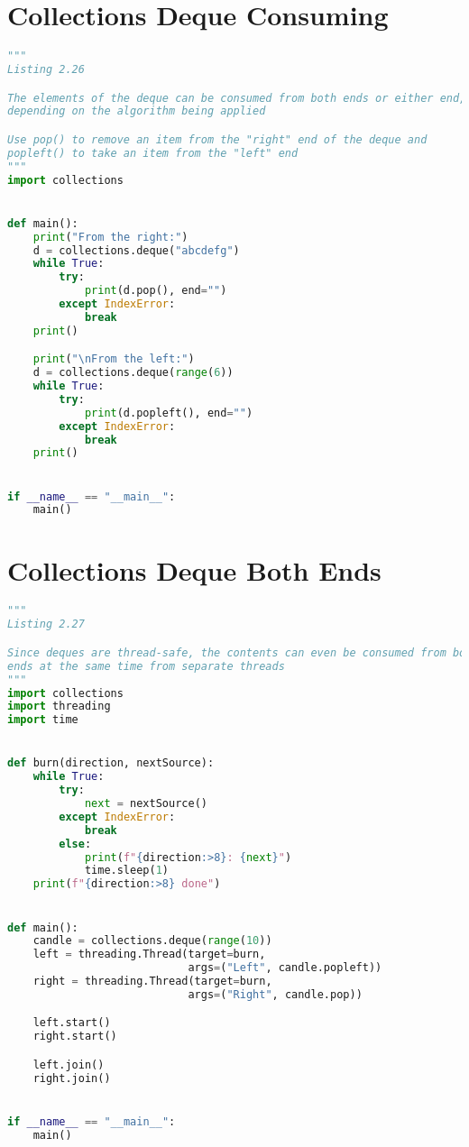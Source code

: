 \documentclass[a4paper,landscape]{report}
\begin{document}
\section{Collections Deque Consuming}
\begin{lstlisting}[language=Python]
"""
Listing 2.26

The elements of the deque can be consumed from both ends or either end,
depending on the algorithm being applied

Use pop() to remove an item from the "right" end of the deque and
popleft() to take an item from the "left" end
"""
import collections


def main():
    print("From the right:")
    d = collections.deque("abcdefg")
    while True:
        try:
            print(d.pop(), end="")
        except IndexError:
            break
    print()

    print("\nFrom the left:")
    d = collections.deque(range(6))
    while True:
        try:
            print(d.popleft(), end="")
        except IndexError:
            break
    print()


if __name__ == "__main__":
    main()

\end{lstlisting}
\section{Collections Deque Both Ends}
\begin{lstlisting}[language=Python]
"""
Listing 2.27

Since deques are thread-safe, the contents can even be consumed from both
ends at the same time from separate threads
"""
import collections
import threading
import time


def burn(direction, nextSource):
    while True:
        try:
            next = nextSource()
        except IndexError:
            break
        else:
            print(f"{direction:>8}: {next}")
            time.sleep(1)
    print(f"{direction:>8} done")


def main():
    candle = collections.deque(range(10))
    left = threading.Thread(target=burn,
                            args=("Left", candle.popleft))
    right = threading.Thread(target=burn,
                            args=("Right", candle.pop))

    left.start()
    right.start()

    left.join()
    right.join()


if __name__ == "__main__":
    main()

\end{lstlisting}
\end{document}

